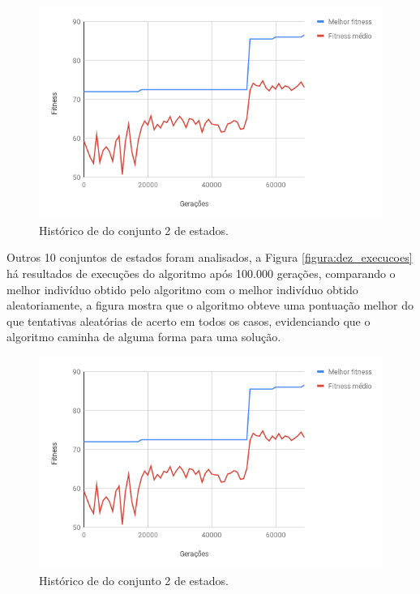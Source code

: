 \begin{figure}[htb]
    \caption{Histórico de \fitness do conjunto 2 de estados.}
    \label{figura:resultado_79}
    \centering
    \includegraphics[scale=0.8]{images/resultado_79}
    \fautor
\end{figure}

Outros 10 conjuntos de estados foram analisados, a Figura \ref{figura:dez_execucoes} há resultados de execuções do algoritmo após 100.000 gerações, comparando o melhor indivíduo obtido pelo algoritmo com o melhor indivíduo obtido aleatoriamente, a figura mostra que o algoritmo obteve uma pontuação melhor do que tentativas aleatórias de acerto em todos os casos, evidenciando que o algoritmo caminha de alguma forma para uma solução.

\begin{figure}[htb]
    \caption{Histórico de \fitness do conjunto 2 de estados.}
    \label{figura:resultado_79}
    \centering
    \includegraphics[scale=0.8]{images/resultado_79}
    \fautor
\end{figure}

